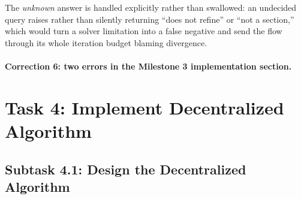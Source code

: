 \documentclass[11pt]{article}
\newif\ifshowcomments
\newcommand{\face}{\trianglelefteqslant}
\theoremstyle{definition}
\theoremstyle{remark}
\newcommand{\prompt}[1]{%
    \ifshowcomments
        ~\todo[inline, color=techgold!80, textcolor=black,caption={Task}]{{\bf Prompt:} #1}%
    \fi
}
\newcommand{\ai}[1]{%
    \ifshowcomments
        \noindent\textcolor{techred}{[AI Agent]: #1}%
    \fi
}
\begin{document}
The \emph{unknown} answer is handled explicitly rather than swallowed: an undecided query
raises rather than silently returning ``does not refine'' or ``not a section,'' which would
turn a solver limitation into a false negative and send the flow through its whole iteration
budget blaming divergence.

\paragraph{Correction 6: two errors in the Milestone 3 implementation section.}

\ai{\textbf{Correction 6.} Two errors in Milestone~3 \S3.3 should be recorded, since they are
in the delivered text. (i) The prose states that \texttt{right\_adjoint()} implements
$(F_{v \face e})^{*} = f^{*}$, ``the pullback.'' It does not; it implements $f_*$, and the
listing's own docstring says so (``Pushes a Node contract to the Edge by REFINING it''). The
pullback is a third method. (ii) Consequently Listing~3 of that report, \texttt{tarski\_step},
calls \texttt{right\_adjoint} where \Cref{eq:contract-laplacian} requires the pullback---and
since \texttt{right\_adjoint} maps agent~$\to$~link rather than link~$\to$~agent, the listing is
type-incorrect as printed. Both are fixed in the current implementation, where transport is a
single method that takes an adjoint pair and cannot be given mismatched legs.}

\section{Task 4: Implement Decentralized Algorithm}
\label{sec:task4}

\prompt{This task builds a fully functional algorithm from the sheaf Laplacian, refining it for
efficiency and integrating it with the Robotarium simulator for UGV testing.}

\subsection{Subtask 4.1: Design the Decentralized Algorithm}
\label{sec:subtask41}

\prompt{Design an algorithm where agents use the sheaf Laplacian to resolve task disagreements
via local updates, robust to communication denial. Deliverable: Algorithm design, part of
Milestone 4's report.}
\end{document}
